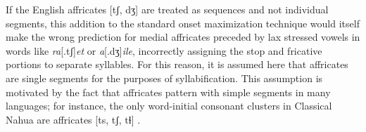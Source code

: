 If the English affricates [tʃ, dʒ] are treated as sequences and not individual segments, this addition to the standard onset maximization technique would itself make the wrong prediction for medial affricates preceded by lax stressed vowels in words like \emph{ra}[.tʃ]\emph{et} or \emph{a}[.dʒ]\emph{ile}, incorrectly assigning the stop and fricative portions to separate syllables. For this reason, it is assumed here that affricates are single segments for the purposes of syllabification. This assumption is motivated by the fact that affricates pattern with simple segments in many languages; for instance, the only word-initial consonant clusters in Classical Nahua are affricates [ts, tʃ, tɬ] \citep[][9]{Launey2011}.

